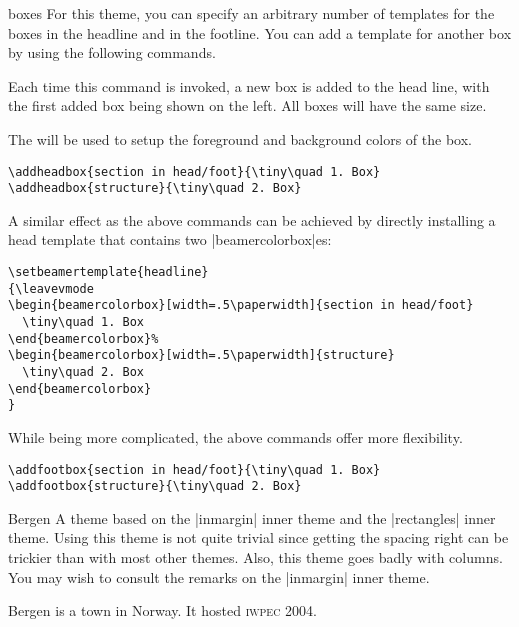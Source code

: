 \begin{themeexample}[{\opt{|[headheight=|\meta{head height}|,footheight=|\meta{foot height}|]|}}]{boxes}
  For this theme, you can specify an arbitrary number of templates for the boxes in the headline and in the footline. You can add a template for another box by using the following commands.

  \begin{command}{\addheadbox{}}
    Each time this command is invoked, a new box is added to the head line, with the first added box being shown on the left. All boxes will have the same size.

    The  will be used to setup the foreground and background colors of the box.
    \example
\begin{verbatim}
\addheadbox{section in head/foot}{\tiny\quad 1. Box}
\addheadbox{structure}{\tiny\quad 2. Box}
\end{verbatim}
    A similar effect as the above commands can be achieved by directly installing a head template that contains two |beamercolorbox|es:
\begin{verbatim}
\setbeamertemplate{headline}
{\leavevmode
\begin{beamercolorbox}[width=.5\paperwidth]{section in head/foot}
  \tiny\quad 1. Box
\end{beamercolorbox}%
\begin{beamercolorbox}[width=.5\paperwidth]{structure}
  \tiny\quad 2. Box
\end{beamercolorbox}
}
\end{verbatim}
    While being more complicated, the above commands offer more flexibility.
  \end{command}

  \begin{command}{\addfootbox{}}
    \example
\begin{verbatim}
\addfootbox{section in head/foot}{\tiny\quad 1. Box}
\addfootbox{structure}{\tiny\quad 2. Box}
\end{verbatim}
  \end{command}
\end{themeexample}

\begin{themeexample}{Bergen}
  A theme based on the |inmargin| inner theme and the |rectangles| inner theme. Using this theme is not quite trivial since getting the spacing right can be trickier than with most other themes. Also, this theme goes badly with columns. You may wish to consult the remarks on the |inmargin| inner theme.

  Bergen is a town in Norway. It hosted \textsc{iwpec} 2004.
\end{themeexample}

